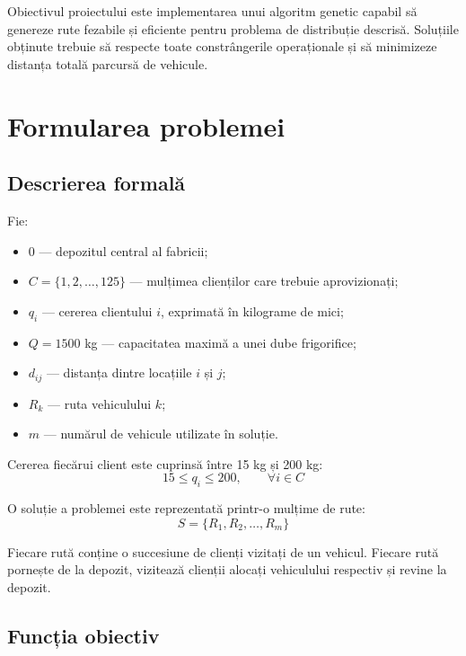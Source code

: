 \documentclass[12pt,a4paper]{article}
\begin{document}
Obiectivul proiectului este implementarea unui algoritm genetic capabil să genereze rute fezabile și eficiente pentru problema de distribuție descrisă. Soluțiile obținute trebuie să respecte toate constrângerile operaționale și să minimizeze distanța totală parcursă de vehicule.

\section{Formularea problemei}

\subsection{Descrierea formală}

Fie:
\begin{itemize}
    \item $0$ — depozitul central al fabricii;
    \item $C=\{1,2,\ldots,125\}$ — mulțimea clienților care trebuie aprovizionați;
    \item $q_i$ — cererea clientului $i$, exprimată în kilograme de mici;
    \item $Q=1500$ kg — capacitatea maximă a unei dube frigorifice;
    \item $d_{ij}$ — distanța dintre locațiile $i$ și $j$;
    \item $R_k$ — ruta vehiculului $k$;
    \item $m$ — numărul de vehicule utilizate în soluție.
\end{itemize}

Cererea fiecărui client este cuprinsă între 15 kg și 200 kg:
\begin{equation}
15 \leq q_i \leq 200, \qquad \forall i \in C
\end{equation}

O soluție a problemei este reprezentată printr-o mulțime de rute:
\begin{equation}
S=\{R_1,R_2,\ldots,R_m\}
\end{equation}

Fiecare rută conține o succesiune de clienți vizitați de un vehicul. Fiecare rută pornește de la depozit, vizitează clienții alocați vehiculului respectiv și revine la depozit.

\subsection{Funcția obiectiv}
\end{document}
